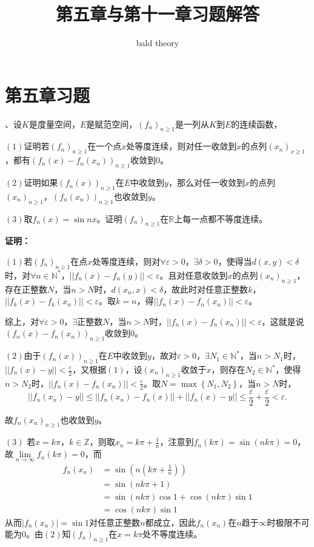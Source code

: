 \documentclass[12pt,fancyhdr,UTF8,openany]{ctexart}
\begin{document}
	\title{第五章与第十一章习题解答}
	\author{bald theory}
	\date{}
	\maketitle
\section*{第五章习题}

、设$K$是度量空间，$E$是赋范空间，$(f_n)_{n\geqslant 1}$是一列从$K$到$E$的连续函数，\par 
$(1)$证明若$(f_n)_{n\geqslant1}$在一个点$x$处等度连续，则对任一收敛到$x$的点列$(x_n)_{x\geqslant 1}$，都有$(f_n(x)-f_n(x_n))_{n\geqslant 1}$收敛到$0$。\par 
$(2)$证明如果$(f_n(x))_{n\geqslant 1}$在$E$中收敛到$y$，那么对任一收敛到$x$的点列$(x_n)_{n\geqslant1}$，$(f_n(x_n))_{n\geqslant1}$也收敛到$y$。\par 
$(3)$取$f_n(x)=\sin nx$。证明$(f_n)_{n\geqslant 1}$在$\mathbb{R}$上每一点都不等度连续。\par 
	\textbf{证明：}\par 
	$(1)$若$(f_n)_{n\geqslant 1}$在点$x$处等度连续，则对$\forall \varepsilon>0$，$\exists \delta>0$，使得当$d(x,y)<\delta$时，对$\forall n\in\mathbb{N}^*$，$||f_n(x)-f_n(y)||<\varepsilon$。且对任意收敛到$x$的点列$(x_n)_{n\geqslant 1}$，存在正整数$N$，当$n>N$时，$d(x_n,x)<\delta$，故此时对任意正整数$k$，$||f_k(x)-f_k(x_n)||<\varepsilon$。取$k=n$，得$||f_n(x)-f_n(x_n)||<\varepsilon$。\par 综上，对$\forall \varepsilon>0$，$\exists$正整数$N$，当$n>N$时，$||f_n(x)-f_n(x_n)||<\varepsilon$，这就是说$(f_n(x)-f_n(x_n))_{n\geqslant 1}$收敛到$0$。\par 
	$(2)$由于$(f_n(x))_{n\geqslant 1}$在$E$中收敛到$y$，故对$\varepsilon>0$，$\exists N_1\in\mathbb{N}^*$，当$n>N_1$时，$||f_n(x)-y||<\frac{\varepsilon}{2}$，又根据$(1)$，设$(x_n)_{n\geqslant 1}$收敛于$x$，则存在$N_2\in\mathbb{N}^*$，使得$n>N_2$时，$||f_n(x)-f_n(x_n)||<\frac{\varepsilon}{2}$。取$N=\max\left\{N_1,N_2\right\}$，当$n>N$时，
	\[||f_n(x_n)-y||\leqslant ||f_n(x_n)-f_n(x)||+||f_n(x)-y||\leqslant \dfrac{\varepsilon}{2}+\dfrac{\varepsilon}{2}<\varepsilon.\]\par 
	故$f_n(x_n)_{n\geqslant 1}$也收敛到$y$。\par 
	$(3)$ 若$x=k\pi$，$k\in\mathbb{Z}$，则取$x_n=k\pi+\frac{1}{n}$，注意到$f_n(k\pi)=\sin(nk\pi)=0$，故$\lim\limits_{n\rightarrow \infty}f_n(k\pi)=0$，而\[\begin{aligned}
		f_n(x_n)&=\sin(n(k\pi+\frac{1}{n}))\\&=\sin(nk\pi+1)\\
		&=\sin(nk\pi)\cos1+\cos(nk\pi)\sin1\\&=\cos(nk\pi)\sin1
	\end{aligned}\]
从而$|f_n(x_n)|=\sin 1$对任意正整数$n$都成立，因此$f_n(x_n)$在$n$趋于$\infty$时极限不可能为$0$。由$(2)$知$(f_n)_{n\geqslant 1}$在$x=k\pi$处不等度连续。\par 
\end{document}
